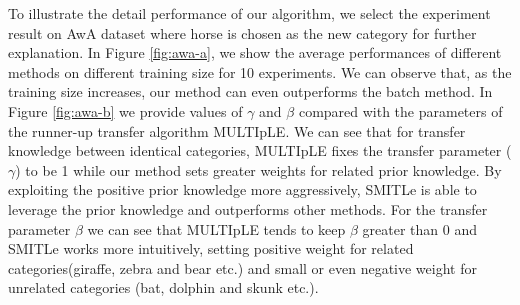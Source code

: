To illustrate the detail performance of our algorithm, we select the experiment result on AwA dataset where horse is chosen as the new category for further explanation. In Figure \ref{fig:awa-a}, we show the average performances of different methods on different training size for 10 experiments. We can observe that, as the training size increases, our method can even outperforms the batch method.
In Figure \ref{fig:awa-b} we provide values of $\gamma$ and $\beta$ compared with the parameters of the runner-up transfer algorithm MULTIpLE. We can see that for transfer knowledge between identical categories, MULTIpLE fixes the transfer parameter ($\gamma$) to be 1 while our method sets greater weights for related prior knowledge. By exploiting the positive prior knowledge more aggressively, SMITLe is able to leverage the prior knowledge and outperforms other methods. For the transfer parameter $\beta$ we can see that MULTIpLE tends to keep $\beta$ greater than 0 and SMITLe works more intuitively, setting positive weight for related categories(giraffe, zebra and bear etc.) and small or even negative weight for unrelated categories (bat, dolphin and skunk etc.).


